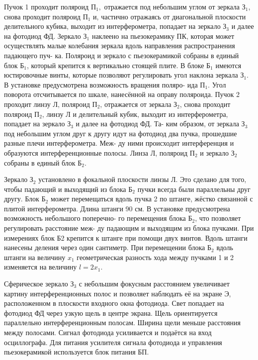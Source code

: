 \documentclass[12pt]{kiarticle} %
\begin{document}
Пучок 1 проходит поляроид $ П_1, $ отражается под небольшим углом
от зеркала $ З_1 $, снова проходит поляроид $ П_1 $ и, частично отражаясь от
диагональной плоскости делительного кубика, выходит из интерферометра, попадает на зеркало $ З_3 $ и далее на фотодиод ФД. Зеркало $ З_1 $
наклеено на пьезокерамику ПК, которая может осуществлять малые колебания зеркала вдоль направления распространения падающего пуч-
ка. Поляроид и зеркало с пьезокерамикой собраны в единый блок $ Б_1 $,
который крепится к вертикально стоящей плите. В блоке $ Б_1 $ имеются
юстировочные винты, которые позволяют регулировать угол наклона
зеркала $ З_1 $. В установке предусмотрена возможность вращения поляро-
ида $ П_1 $. Угол поворота отсчитывается по шкале, нанесённой на оправу
поляроида.
Пучок 2 проходит линзу Л, поляроид $ П_2 $, отражается от зеркала $ З_2 $,
снова проходит поляроид $ П_2 $, линзу Л и делительный кубик, выходит из
интерферометра, попадает на зеркало $ З_3 $ и далее на фотодиод ФД. Та-
ким образом, от зеркала $ З_3 $ под небольшим углом друг к другу идут на
фотодиод два пучка, прошедшие разные плечи интерферометра. Меж-
ду ними происходит интерференция и образуются интерференционные
полосы. Линза Л, поляроид $ П_2 $ и зеркало $ З_2 $ собраны в единый блок $ Б_2 $.

Зеркало $ З_2 $ установлено в фокальной плоскости линзы Л. Это сделано
для того, чтобы падающий и выходящий из блока $ Б_2 $ пучки всегда были
параллельны друг другу. Блок $ Б_2 $ может перемещаться вдоль пучка 2
по штанге, жёстко связанной с плитой интерферометра. Длина штанги
90 см. В установке предусмотрена возможность небольшого поперечно-
го перемещения блока $ Б_2 $, что позволяет регулировать расстояние меж-
ду падающим и выходящим из блока пучками. При измерениях блок
Б2 крепится к штанге при помощи двух винтов. Вдоль штанги нанесены деления через один сантиметр. При перемещении блока $ Б_2 $ вдоль
штанги на величину $ x_1 $ геометрическая разность хода между пучками
1 и 2 изменяется на величину $ l = 2x_1 $.

Сферическое зеркало $ З_3 $ с небольшим фокусным расстоянием увеличивает картину интерференционных полос и позволяет наблюдать её
на экране Э, расположенном в плоскости входного окна фотодиода.
Свет попадает на фотодиод ФД через узкую щель в центре экрана.
Щель ориентируется параллельно интерференционным полосам. Ширина щели меньше расстояния между полосами. Сигнал фотодиода усиливается и подаётся на вход осциллографа. Для питания усилителя
сигнала фотодиода и управления пьезокерамикой используется блок
питания БП.
\end{document}

